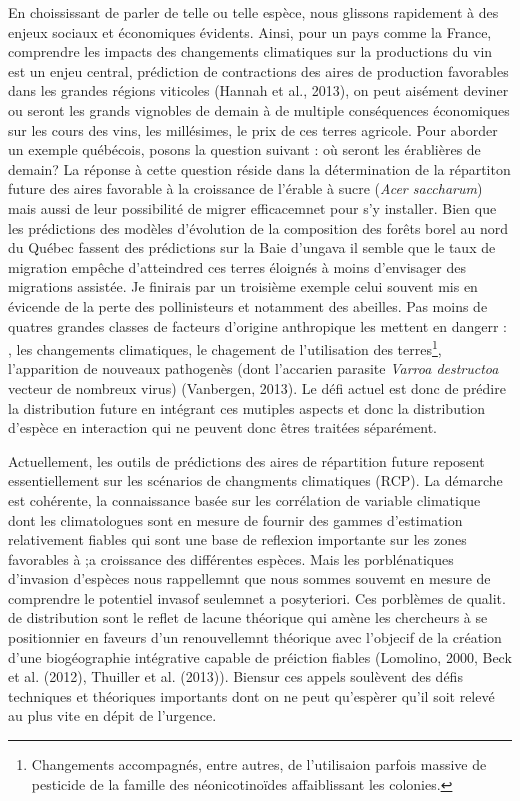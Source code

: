 En choississant de parler de telle ou telle espèce, nous glissons
rapidement à des enjeux sociaux et économiques évidents. Ainsi, pour un
pays comme la France, comprendre les impacts des changements climatiques
sur la productions du vin est un enjeu central, prédiction de
contractions des aires de production favorables dans les grandes régions
viticoles (Hannah et al., 2013), on peut aisément deviner ou seront les
grands vignobles de demain à de multiple conséquences économiques sur
les cours des vins, les millésimes, le prix de ces terres agricole. Pour
aborder un exemple québécois, posons la question suivant : où seront les
érablières de demain? La réponse à cette question réside dans la
détermination de la répartiton future des aires favorable à la
croissance de l'érable à sucre (\emph{Acer saccharum}) mais aussi de
leur possibilité de migrer efficacemnet pour s'y installer. Bien que les
prédictions des modèles d'évolution de la composition des forêts borel
au nord du Québec fassent des prédictions sur la Baie d'ungava il semble
que le taux de migration empêche d'atteindred ces terres éloignés à
moins d'envisager des migrations assistée. Je finirais par un troisième
exemple celui souvent mis en évicende de la perte des pollinisteurs et
notamment des abeilles. Pas moins de quatres grandes classes de facteurs
d'origine anthropique les mettent en dangerr : , les changements
climatiques, le chagement de l'utilisation des terres\footnote{Changements
  accompagnés, entre autres, de l'utilisaion parfois massive de
  pesticide de la famille des néonicotinoïdes affaiblissant les
  colonies.}, l'apparition de nouveaux pathogenès (dont l'accarien
parasite \emph{Varroa destructoa} vecteur de nombreux virus) (Vanbergen,
2013). Le défi actuel est donc de prédire la distribution future en
intégrant ces mutiples aspects et donc la distribution d'espèce en
interaction qui ne peuvent donc êtres traitées séparément.

Actuellement, les outils de prédictions des aires de répartition future
reposent essentiellement sur les scénarios de changments climatiques
(RCP). La démarche est cohérente, la connaissance basée sur les
corrélation de variable climatique dont les climatologues sont en mesure
de fournir des gammes d'estimation relativement fiables qui sont une
base de reflexion importante sur les zones favorables à ;a croissance
des différentes espèces. Mais les porblénatiques d'invasion d'espèces
nous rappellemnt que nous sommes souvemt en mesure de comprendre le
potentiel invasof seulemnet a posyteriori. Ces porblèmes de qualit. de
distribution sont le reflet de lacune théorique qui amène les chercheurs
à se positionnier en faveurs d'un renouvellemnt théorique avec l'objecif
de la création d'une biogéographie intégrative capable de préiction
fiables (Lomolino, 2000, Beck et al. (2012), Thuiller et al. (2013)).
Biensur ces appels soulèvent des défis techniques et théoriques
importants dont on ne peut qu'espèrer qu'il soit relevé au plus vite en
dépit de l'urgence.

